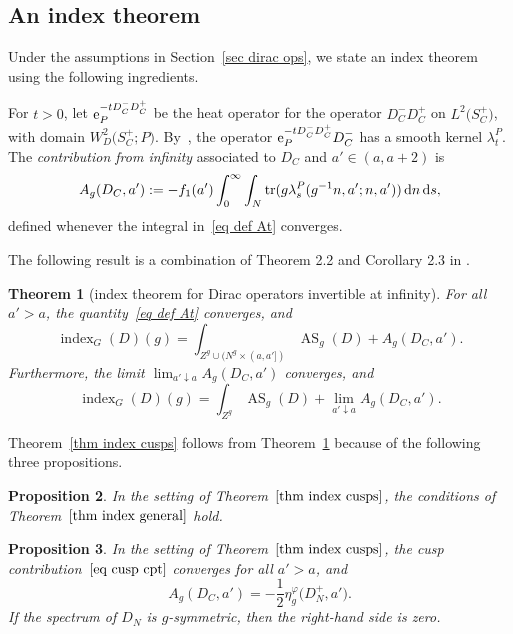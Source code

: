 \documentclass[10pt,a4paper]{amsart}
\numberwithin{equation}{section}
\newtheorem{Theorem}{Theorem}[section]
\newtheorem{Proposition}[Theorem]{Proposition}
 { \theoremstyle{definition}
\newtheorem{Definition}[Theorem]{Definition}
\newtheorem{Note}[Theorem]{Note}
\newtheorem{Example}[Theorem]{Example}
\newtheorem{Remark}[Theorem]{Remark} }
\DeclareMathOperator{\tr}{tr}
\DeclareMathOperator{\AS}{AS}
\DeclareMathOperator{\ind}{index}
\begin{document}
\subsection{An index theorem} \label{sec index thm general}

Under the assumptions in Section~\ref{sec dirac ops}, we state an index theorem using the following ingredients.

For $t>0$, let ${\rm e}_{P}^{-t D_C^- D_C^+}$ be the heat operator for the operator
 $D^-_C D_C^+$ on $L^2\big(S_C^+\big)$, with domain $W^2_D\big(S_C^+; P\big)$.
By~\cite[Lemma 4.7]{HW21a}, the operator ${\rm e}_{P}^{-t D_C^- D_C^+}D_C^-$ has a smooth kernel $ \lambda_t^{P}$.
 The \emph{contribution from infinity} associated to $D_C$ and $a' \in (a,a+2)$ is
\begin{equation} \label{eq def At}
A_{g}(D_C, a') := -f_1(a') \int_0^{\infty}
\int_N \tr(g \lambda_s^{P}(g^{-1}n, a'; n, a'))\, {\rm d}n\,{\rm d}s,
\end{equation}
defined whenever
 the integral in~\eqref{eq def At} converges.

The following result is a combination of Theorem 2.2 and Corollary 2.3 in \cite{HW21a}.
\begin{Theorem}[index theorem for Dirac operators invertible at infinity]\label{thm index general}
 For all $a' > a$, the quantity~\eqref{eq def At} converges, and
\begin{equation} \label{eq index general}
\ind_G(D)(g) = \int_{Z^g \cup (N^g \times (a,a'])} \AS_g(D)+ A_{g}(D_C, a').
\end{equation}
Furthermore, the limit $\lim_{a' \downarrow a}A_{g}(D_C, a')$ converges, and
\[
\ind_G(D)(g) = \int_{Z^g} \AS_g(D)+ \lim_{a' \downarrow a}A_{g}(D_C, a').
\]
\end{Theorem}

Theorem~\ref{thm index cusps} follows from Theorem~\ref{thm index general} because of the following three propositions.
\begin{Proposition} \label{prop ind cusps cond}
In the setting of Theorem~$\ref{thm index cusps}$, the conditions of Theorem~$\ref{thm index general}$ hold.
\end{Proposition}

\begin{Proposition} \label{prop ind cusp contr}
In the setting of Theorem~$\ref{thm index cusps}$, the cusp contribution~$\eqref{eq cusp cpt}$ converges for all $a'>a$, and
\begin{equation*} %
A_{g}(D_C, a') = -\frac{1}{2}\eta_g^{\varphi}\big(D_N^+, a'\big).
\end{equation*}
If the spectrum of $D_N$ is $g$-symmetric, then the right-hand side is zero.
\end{Proposition}
\end{document}
